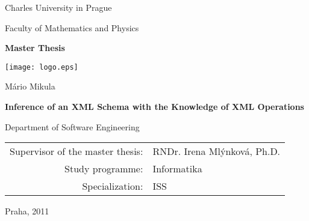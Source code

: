 \documentclass[12pt,a4paper]{report}
\def\mftitle{Inference of an XML Schema with the Knowledge of XML Operations}
\def\mfthesistype{Master Thesis}
\def\mfauthor{Mário Mikula}
\def\mfadvisor{RNDr. Irena Mlýnková, Ph.D.}
\def\mfplacedate{Praha, 2011}
\begin{document}


\pagestyle{empty}
\begin{center}

\large

Charles University in Prague

\medskip

Faculty of Mathematics and Physics

\vfill

{\bf\Large \mfthesistype}

\vfill

\centerline{\mbox{\texttt{[image: logo.eps]}}}

\vfill
\vspace{5mm}

{\LARGE \mfauthor}

\vspace{15mm}

{\LARGE\bfseries \mftitle}

\vfill

Department of Software Engineering

\vfill

\begin{tabular}{rl}

Supervisor of the master thesis: & \mfadvisor \\
\noalign{\vspace{2mm}}
Study programme: & Informatika \\
\noalign{\vspace{2mm}}
Specialization: & ISS \\
\end{tabular}

\vfill

\mfplacedate

\end{center}

\newpage


\end{document}
